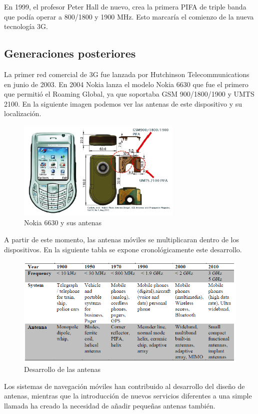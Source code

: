 \documentclass[a4paper,11pt,titlepage]{article}
\begin{document}
En 1999, el profesor Peter Hall de nuevo, crea la primera PIFA de triple banda que podía operar a 800/1800 y 1900 MHz. Esto marcaría el comienzo de la nueva tecnología 3G.
\newpage
\subsection{Generaciones posteriores}
La primer red comercial de 3G fue lanzada por Hutchinson Telecommunications en junio de 2003. En 2004 Nokia lanza el modelo Nokia 6630 que fue el primero que permitió el Roaming Global, ya que soportaba GSM 900/1800/1900 y UMTS 2100. En la siguiente imagen podemos ver las antenas de este dispositivo y su localización.
\begin{figure}[H]
\centering
\includegraphics[width=0.7\textwidth]{nokia6630}
\caption{Nokia 6630 y sus antenas}
\end{figure}
A partir de este momento, las antenas móviles se multiplicaran dentro de los dispositivos. En la siguiente tabla se expone cronológicamente este desarrollo.
\begin{figure}[H]
\centering
\includegraphics[width=1.2\textwidth]{crono}
\caption{Desarrollo de las antenas}
\end{figure}
Los sistemas de navegación móviles han contribuido al desarrollo del diseño de antenas, mientras que la introducción de nuevos servicios diferentes a una simple llamada ha creado la necesidad de añadir pequeñas antenas también.
\end{document}
